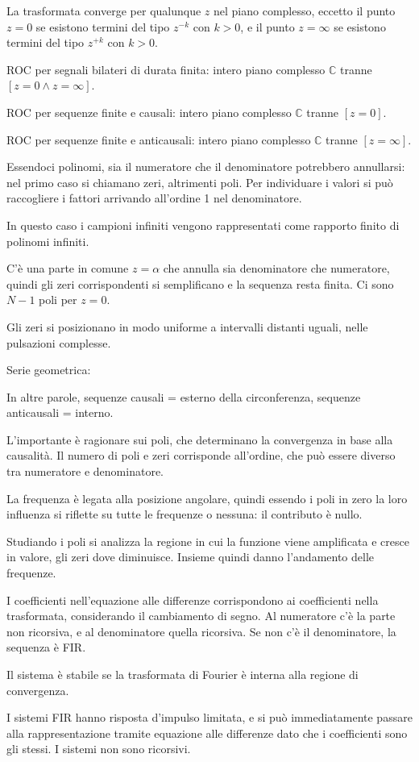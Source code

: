 La trasformata converge per qualunque $z$ nel piano complesso, eccetto il punto $z = 0$ se esistono termini del tipo $z^{-k}$ con $k > 0$, e il punto $z = \infty$ se esistono termini del tipo $z^{+k}$ con $k > 0$.

ROC per segnali bilateri di durata finita: intero piano complesso $\mathbb{C}$ tranne $[z = 0 \land z = \infty]$.

ROC per sequenze finite e causali: intero piano complesso $\mathbb{C}$ tranne $[z = 0]$.

ROC per sequenze finite e anticausali: intero piano complesso $\mathbb{C}$ tranne $[z = \infty]$.

Essendoci polinomi, sia il numeratore che il denominatore potrebbero annullarsi: nel primo caso si chiamano zeri, altrimenti poli. Per individuare i valori si può raccogliere i fattori arrivando all'ordine 1 nel denominatore.

In questo caso i campioni infiniti vengono rappresentati come rapporto finito di polinomi infiniti.

C'è una parte in comune $z = \alpha$ che annulla sia denominatore che numeratore, quindi gli zeri corrispondenti si semplificano e la sequenza resta finita. Ci sono $N - 1$ poli per $z = 0$.

Gli zeri si posizionano in modo uniforme a intervalli distanti uguali, nelle pulsazioni complesse. 

Serie geometrica:

In altre parole, sequenze causali = esterno della circonferenza, sequenze anticausali = interno.

L'importante è ragionare sui poli, che determinano la convergenza in base alla causalità. Il numero di poli e zeri corrisponde all'ordine, che può essere diverso tra numeratore e denominatore.

La frequenza è legata alla posizione angolare, quindi essendo i poli in zero la loro influenza si riflette su tutte le frequenze o nessuna: il contributo è nullo.

Studiando i poli si analizza la regione in cui la funzione viene amplificata e cresce in valore, gli zeri dove diminuisce. Insieme quindi danno l'andamento delle frequenze.

I coefficienti nell'equazione alle differenze corrispondono ai coefficienti nella trasformata, considerando il cambiamento di segno. Al numeratore c'è la parte non ricorsiva, e al denominatore quella ricorsiva. Se non c'è il denominatore, la sequenza è FIR.

Il sistema è stabile se la trasformata di Fourier è interna alla regione di convergenza. 

I sistemi FIR hanno risposta d'impulso limitata, e si può immediatamente passare alla rappresentazione tramite equazione alle differenze dato che i coefficienti sono gli stessi. I sistemi non sono ricorsivi.


